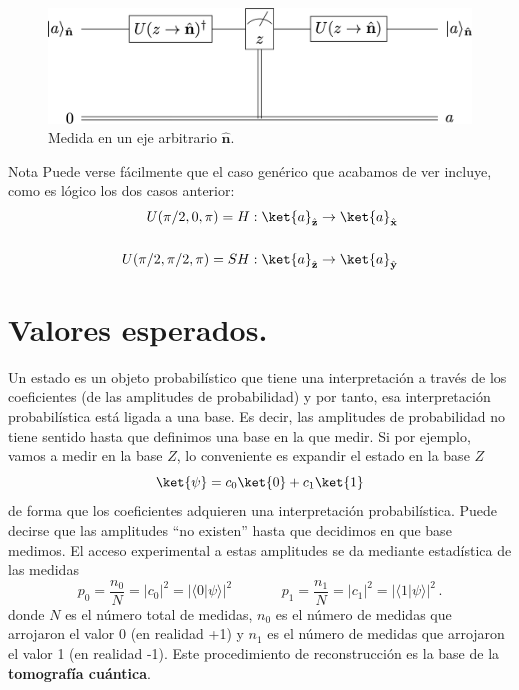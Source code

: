 \documentclass[a4paper,11pt]{book} %
\numberwithin{equation}{chapter}
\newcommand{\braket}[2]{\langle #1|#2\rangle}
\begin{document}
	\begin{figure}[H]
	\centering 
	\includegraphics[width=0.7\linewidth]{Figuras/Fig_medidas2_nbasis_measure2.png}
	\caption{Medida en un eje arbitrario $\hat{ \bm n}$.}
	\label{Fig_medidas2_nbasis_measure2}
	\end{figure}

	\begin{mybox_blue}{Nota}
	Puede verse fácilmente que el caso genérico que acabamos de ver incluye, como es lógico
	los dos casos anterior:
	\begin{eqnarray}
 	U(\pi/2,0,\pi)=H : \ket{a}_{\hat{\bf z}} \to \ket{a}_{\hat{\bf x}} \\ \rule{0mm}{8mm}
 	U(\pi/2,\pi/2,\pi)= SH  : \ket{a}_{\hat{\bf z}} \to \ket{a}_{\hat{\bf y}}
	\end{eqnarray}
	\end{mybox_blue}
     
    


    \section{Valores esperados.}
    
    
Un estado es un objeto probabilístico que tiene una interpretación a través de los coeficientes (de las amplitudes de probabilidad) y por tanto, esa interpretación probabilística está ligada a una base. Es decir, las amplitudes de probabilidad no tiene sentido hasta que definimos una base en la que medir. Si por ejemplo, vamos a medir en la base $Z$, lo conveniente es expandir el estado en la base $Z$
\begin{equation}
\ket{\psi} = c_0 \ket{0} + c_1 \ket{1}
\end{equation}
de forma que los coeficientes adquieren una interpretación probabilística. Puede decirse que las amplitudes ``no existen'' hasta que decidimos en que base medimos. El acceso experimental a estas amplitudes se da mediante estadística de las medidas
\begin{equation}
\boxed{p_0 = \frac{n_{0}}{N} = |c_0|^2 = |\braket{0}{\psi}|^2} ~~~~~~~~~~~~~~~~ \boxed{p_1 = \frac{n_{1}}{N}=|c_1|^2 =  |\braket{1}{\psi}|^2} \, .
\end{equation}
donde $N$ es el número total de medidas, $n_0$ es el número de medidas que arrojaron el valor 0 (en realidad +1) y $n_1$ es el número de medidas que arrojaron el valor 1 (en realidad -1).
Este procedimiento de reconstrucción es la base de la \textbf{tomografía cuántica}.
\end{document}
